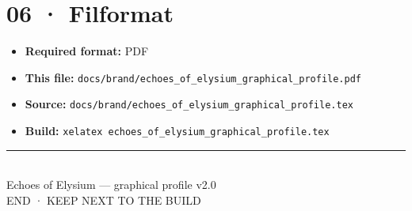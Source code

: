 \documentclass[11pt,a4paper]{article}
\begin{document}
\clearpage

\section*{06 · Filformat}

\begin{itemize}
  \item \textbf{Required format:} PDF
  \item \textbf{This file:} \texttt{docs/brand/echoes\_of\_elysium\_graphical\_profile.pdf}
  \item \textbf{Source:} \texttt{docs/brand/echoes\_of\_elysium\_graphical\_profile.tex}
  \item \textbf{Build:} \texttt{xelatex echoes\_of\_elysium\_graphical\_profile.tex}
\end{itemize}

\vspace{1.2em}
\begin{center}
\textcolor{signal!55}{\rule{8cm}{0.65pt}}\\[0.65em]
{\sffamily\textcolor{ghost}{Echoes of Elysium — graphical profile v2.0}}\\[0.35em]
{\small\textcolor{signal}{END · KEEP NEXT TO THE BUILD}}
\end{center}
\end{document}
